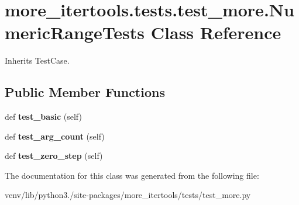 \hypertarget{classmore__itertools_1_1tests_1_1test__more_1_1_numeric_range_tests}{}\section{more\+\_\+itertools.\+tests.\+test\+\_\+more.\+Numeric\+Range\+Tests Class Reference}
\label{classmore__itertools_1_1tests_1_1test__more_1_1_numeric_range_tests}


Inherits Test\+Case.

\subsection*{Public Member Functions}
\begin{DoxyCompactItemize}
\item 
\mbox{\label{classmore__itertools_1_1tests_1_1test__more_1_1_numeric_range_tests_a1468dc40f9ee318782f4dd320ba9ab3f}} 
def {\bfseries test\+\_\+basic} (self)
\item 
\mbox{\label{classmore__itertools_1_1tests_1_1test__more_1_1_numeric_range_tests_ac6bcc362a852db36dd51109ac6a7770b}} 
def {\bfseries test\+\_\+arg\+\_\+count} (self)
\item 
\mbox{\label{classmore__itertools_1_1tests_1_1test__more_1_1_numeric_range_tests_afd301cf2b4a70645a9c82790385e7e2f}} 
def {\bfseries test\+\_\+zero\+\_\+step} (self)
\end{DoxyCompactItemize}


The documentation for this class was generated from the following file\+:\begin{DoxyCompactItemize}
\item 
venv/lib/python3./site-\/packages/more\+\_\+itertools/tests/test\+\_\+more.\+py\end{DoxyCompactItemize}
